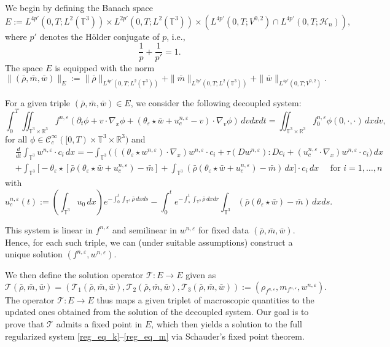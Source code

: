 \documentclass[10pt,reqno]{amsart}
\numberwithin{equation}{section}
\newcommand{\R}{\mathbb R}
\newcommand{\T}{\mathbb T}
\newcommand{\bq}{\begin{equation}}
\newcommand{\eq}{\end{equation}}
\newcommand{\e}{\varepsilon}
\newcommand{\lt}{\left}
\newcommand{\rt}{\right}
\newcommand{\pa}{\partial}
\newcommand{\intt}{\int_{\T^3}}
\newcommand{\inttr}{\iint_{\T^3 \times \R^3}}
\begin{document}
We begin by defining the Banach space
\[
E:= L^{4p'}(0,T;L^2(\T^3))  \times  L^{2p'}(0,T;L^2(\T^3))  \times \lt(L^{4p'}(0,T;V^{0,2}) \cap L^{4p'}(0,T;\mathcal{H}_n)\rt),
\]
where $p'$ denotes the H\"older conjugate of $p$, i.e.,
\[
\frac1p+\frac1{p'}=1.
\]
The space $E$ is equipped with the norm
\[
\|(\bar \rho, \bar m, \bar w) \|_E := \|\bar\rho\|_{L^{4p'}(0,T; L^2(\T^3))} + \|\bar m\|_{L^{2p'}(0,T; L^2 (\T^3))} + \|\bar w \|_{L^{4p'}(0,T;V^{0,2})}.
\]
 

For a given triple $(\bar\rho, \bar m, \bar w) \in E$, we consider the following decoupled system:  
\begin{equation}\label{dec_eq_k}
\int_0^T \!\!\inttr f^{n,\e}(\pa_t \phi + v \cdot \nabla_x \phi + (\theta_\e\star \bar{w}+u_c^{n,\e}-v )\cdot \nabla_v  \phi)\,dvdxdt = \inttr f_0^{n,\e} \phi(0,\cdot,\cdot)\,dxdv,
\end{equation}
for all $\phi \in \mathcal{C}_c^\infty([0,T)\times \T^3 \times \R^3)$ and 
\bq\label{dec_eq_m}
\begin{aligned}
&  \frac{d}{dt} \int_{\T^3} w^{n,\e} \cdot c_i \,dx  =   -\int_{\T^3} \bigg( ((\theta_\e \star w^{n,\e}) \cdot \nabla_x)w^{n,\e} \cdot c_i  +  \tau(Dw^{n,\e}) : D c_i  +  ( u_c^{n,\e} \cdot \nabla_x ) w^{n,\e} \cdot  c_i  \bigg) \,dx
\\ & + 
\int_{\T^3} \bigg[  -\theta_\e \star \lt[ \bar{\rho}(\theta_\e \star \bar{w} +u_c^{n,\e})-\bar{m}\rt]  + \int_{\T^3}(\bar{\rho}(\theta_\e\star \bar{w}+u_c^{n,\e})-\bar{m})\,dx \bigg] \cdot c_i \,dx \quad \mbox{ for } i=1,\dots,n
\end{aligned}
\eq
with
\[
u_c^{n,\e}(t):= \lt(\intt u_0\,dx\rt)e^{-\int_0^t \intt \bar \rho\,dxds }- \int_0^t e^{-\int_s^t \intt \bar \rho \,dxdr }\intt (\bar \rho (\theta_\e\star \bar w) - \bar m)\,dxds.
\]

This system is linear in $f^{n,\e}$ and semilinear in $w^{n,\e}$ for fixed data $(\bar\rho, \bar m, \bar w)$. Hence, for each such triple, we can (under suitable assumptions) construct a unique solution $(f^{n,\e}, w^{n,\e})$.

We then define the solution operator $\mathcal{T}: E \to E$ given as
\[
\mathcal{T}(\bar\rho, \bar m, \bar w) =(\mathcal{T}_1(\bar\rho, \bar m, \bar w), \mathcal{T}_2(\bar\rho, \bar m, \bar w), \mathcal{T}_3(\bar\rho, \bar m, \bar w))  :=(\rho_{f^{n,\e}}, m_{f^{n,\e}}, w^{n,\e}).
\]
The operator $\mathcal{T} : E \to E$ thus maps a given triplet of macroscopic quantities to the updated ones obtained from the solution of the decoupled system. Our goal is to prove that $\mathcal{T}$ admits a fixed point in $E$, which then yields a solution to the full regularized system \eqref{reg_eq_k}--\eqref{reg_eq_m} via Schauder's fixed point theorem.
%
%
% 
%
%
\end{document}
